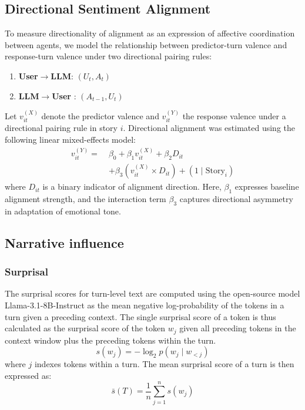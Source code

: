 \documentclass[11pt]{article}
\begin{document}
\subsection{Directional Sentiment Alignment}
To measure directionality of alignment as an expression of affective coordination between agents, we model the relationship between predictor-turn valence and response-turn valence under two directional pairing rules: 

\begin{enumerate}
    \item \textbf{User$\rightarrow$LLM}: $(U_t, A_t)$
    \item \textbf{LLM$\rightarrow$User }: $(A_{t-1}, U_t)$
\end{enumerate}


Let $v^{(X)}_{it}$ denote the predictor valence and $v^{(Y)}_{it}$ the response valence under a directional pairing rule in story $i$. Directional alignment was estimated using the following linear mixed-effects model:
\begin{equation}
\begin{aligned}
v^{(Y)}_{it} =\;& \beta_0 + \beta_1 v^{(X)}_{it} + \beta_2 D_{it} \\
&+ \beta_3 \left( v^{(X)}_{it} \times D_{it} \right) + (1 \mid \mathrm{Story}_i)
\end{aligned}
\end{equation}
where $D_{it}$ is a binary indicator of alignment direction. Here, $\beta_1$ expresses baseline alignment strength, and the interaction term $\beta_3$ captures directional asymmetry in adaptation of emotional tone.

\subsection{Narrative influence}
\subsubsection{Surprisal}
The surprisal scores for turn-level text are computed using the open-source model Llama-3.1-8B-Instruct as the mean negative log-probability of the tokens in a turn given a preceding context. The single surprisal score of a token is thus calculated as the surprisal score of the token $w_j$ given all preceding tokens in the context window plus the preceding tokens within the turn. 
 \begin{equation}
s(w_j) = -\log_2 p(w_j \mid w_{<j})
\end{equation}
where $j$ indexes tokens within a turn. The mean surprisal score of a turn is then expressed as:
\begin{equation}
\bar{s}(T) = \frac{1}{n} \sum_{j=1}^{n} s(w_j)
\end{equation}
\end{document}

